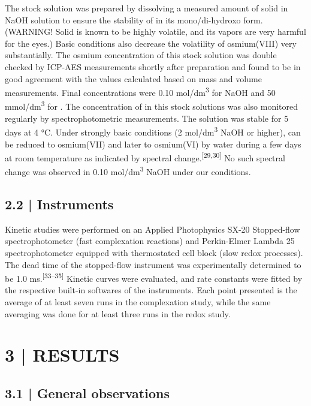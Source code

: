 \documentclass{article}
\begin{document}
The  stock solution was prepared by dissolving a measured amount of solid  in NaOH solution to ensure the stability of  in its mono/di-hydroxo form. (WARNING! Solid  is known to be highly volatile, and its vapors are very harmful for the eyes.) Basic conditions also decrease the volatility of osmium(VIII) very substantially. The osmium concentration of this stock solution was double checked by ICP-AES measurements shortly after preparation and found to be in good agreement with the values calculated based on mass and volume measurements. Final concentrations were 0.10 mol/dm\textsuperscript{3} for NaOH and 50 mmol/dm\textsuperscript{3} for . The concentration of  in this stock solutions was also monitored regularly by spectrophotometric measurements. The solution was stable for 5 days at 4 °C. Under strongly basic conditions (2 mol/dm\textsuperscript{3} NaOH or higher),  can be reduced to osmium(VII) and later to osmium(VI) by water during a few days at room temperature as indicated by spectral change.\textsuperscript{[29,30]} No such spectral change was observed in 0.10 mol/dm\textsuperscript{3} NaOH under our conditions.

\subsection*{2.2 \quad | \quad Instruments}

Kinetic studies were performed on an Applied Photophysics SX-20 Stopped-flow spectrophotometer (fast complexation reactions) and Perkin-Elmer Lambda 25 spectrophotometer equipped with thermostated cell block (slow redox processes). The dead time of the stopped-flow instrument was experimentally determined to be 1.0 ms.\textsuperscript{[33–35]} Kinetic curves were evaluated, and rate constants were fitted by the respective built-in softwares of the instruments. Each point presented is the average of at least seven runs in the complexation study, while the same averaging was done for at least three runs in the redox study.

\section*{3 \quad | \quad RESULTS}

\subsection*{3.1 \quad | \quad General observations}
\end{document}
